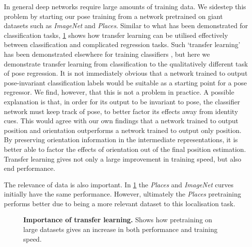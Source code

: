 In general deep networks require large amounts of training data. We sidestep this problem by starting our pose training from a network pretrained on giant datasets such as \textit{ImageNet} and \textit{Places}. Similar to what has been demonstrated for classification tasks, \cref{fig:transfer} shows how transfer learning can be utilised effectively between classification and complicated regression tasks. Such `transfer learning' has been demonstrated elsewhere for training classifiers \citep{razavian2014cnn,oquab2014learning,bengio2013representation}, but here we demonstrate transfer learning from classification to the qualitatively different task of pose regression. It is not immediately obvious that a network trained to output pose-invariant classification labels would be suitable as a starting point for a pose regressor. We find, however, that this is not a problem in practice. A possible explanation is that, in order for its output to be invariant to pose, the classifier network must keep track of pose, to better factor its effects away from identity cues. This would agree with our own findings that a network trained to output position and orientation outperforms a network trained to output only position. By preserving orientation information in the intermediate representations, it is better able to factor the effects of orientation out of the final position estimation. Transfer learning gives not only a large improvement in training speed, but also end performance. 

The relevance of data is also important. In \cref{fig:transfer} the \textit{Places} and \textit{ImageNet} curves initially have the same performance. However, ultimately the \textit{Places} pretraining performs better due to being a more relevant dataset to this localisation task.

\begin{figure}[t]
\begin{center}
\end{center}
   \caption[Importance of transfer learning.]{\textbf{Importance of transfer learning.} Shows how pretraining on large datasets gives an increase in both performance and training speed.}
\label{fig:transfer}
\end{figure}

